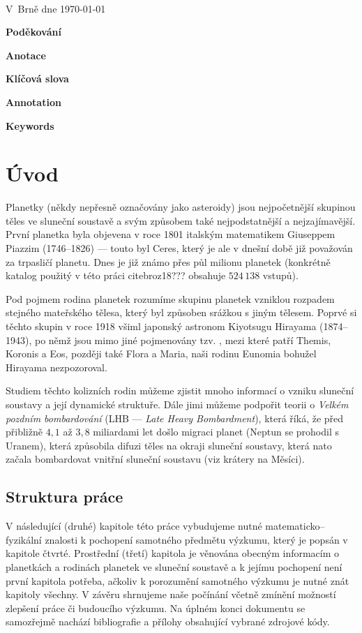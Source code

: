 \documentclass[A4paper, 12pt, oneside]{book}
\begin{document}
\

V~Brně dne \today\ \dotfill \hspace{10mm}

\newpage

{\large \bfseries Poděkování}

\newpage

{\large \bfseries Anotace}

{\large \bfseries Klíčová slova}

{\large \bfseries Annotation}

{\large \bfseries Keywords}

\newpage

\tableofcontents

\newpage 
\pagestyle{headings} %
\chapter{Úvod} \label{ch:uvod}
Planetky (někdy nepřesně označovány jako asteroidy) jsou nejpočetnější skupinou těles ve sluneční soustavě a svým způsobem také nejpodstatnější a nejzajímavější. První planetka byla objevena v roce 1801 italským matematikem Giuseppem Piazzim (1746--1826) --- touto  byl Ceres, který je ale v dnešní době již považován za trpasličí planetu. Dnes je již známo přes půl milionu planetek (konkrétně katalog použitý v této práci cite{broz18}??? obsahuje $524\,138$ vstupů).

Pod pojmem rodina planetek rozumíme skupinu planetek vzniklou rozpadem stejného mateřského tělesa, který byl způsoben srážkou s jiným tělesem. Poprvé si těchto skupin v roce 1918 všiml japonský astronom Kiyotsugu Hirayama (1874--1943), po němž jsou mimo jiné pojmenovány tzv. , mezi které patří Themis, Koronis a Eos, později také Flora a Maria, naši rodinu Eunomia bohužel Hirayama nezpozoroval. 

Studiem těchto kolizních rodin můžeme zjistit mnoho informací o vzniku sluneční soustavy a její dynamické struktuře. Dále jimi můžeme podpořit teorii o \textit{Velkém pozdním bombardování} (LHB --- \textit{Late Heavy Bombardment}), která říká, že před přibližně $4,1$ až $3,8$ miliardami let došlo migraci planet (Neptun se prohodil s Uranem), která způsobila difuzi těles na okraji sluneční soustavy, která nato začala bombardovat vnitřní sluneční soustavu (viz krátery na Měsíci).

\section{Struktura práce}
V následující (druhé) kapitole této práce vybudujeme nutné matematicko--fyzikální znalosti k pochopení samotného předmětu výzkumu, který je popsán v kapitole čtvrté. Prostřední (třetí) kapitola je věnována obecným informacím o planetkách a rodinách planetek ve sluneční soustavě a k jejímu pochopení není první kapitola potřeba, ačkoliv k porozumění samotného výzkumu je nutné znát kapitoly všechny. V závěru shrnujeme naše počínání včetně zmínění možností zlepšení práce či budoucího výzkumu. Na úplném konci dokumentu se samozřejmě nachází bibliografie a přílohy obsahující vybrané zdrojové kódy.
\end{document}
